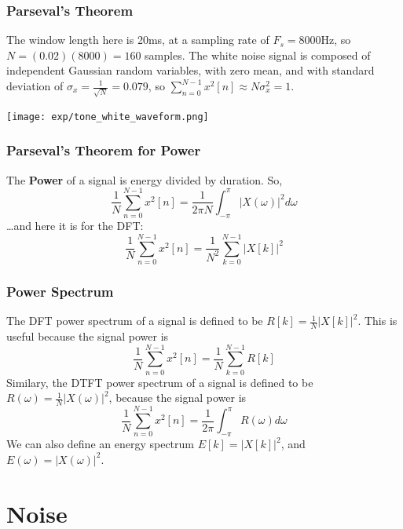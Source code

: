 \documentclass{beamer}
\begin{document}
\begin{frame}
  \frametitle{Parseval's Theorem}

  The window length here is 20ms, at a sampling rate of $F_s=8000$Hz,
  so $N=(0.02)(8000)=160$ samples.  The white noise signal is composed
  of independent Gaussian random variables, with zero mean, and with
  standard deviation of $\sigma_x=\frac{1}{\sqrt{N}}=0.079$, so
  $\sum_{n=0}^{N-1}x^2[n] \approx N\sigma_x^2 = 1$.
  
  \centerline{\texttt{[image: exp/tone\_white\_waveform.png]}}
\end{frame}

\begin{frame}
  \frametitle{Parseval's Theorem for Power}

  The {\bf Power} of a signal is energy divided by duration.  So,
  \[
  \frac{1}{N}\sum_{n=0}^{N-1}x^2[n] = \frac{1}{2\pi N}\int_{-\pi}^{\pi}\left|X(\omega)\right|^2d\omega
  \]
  \ldots and here it is for the DFT:
  \[
  \frac{1}{N}\sum_{n=0}^{N-1}x^2[n] = \frac{1}{N^2}\sum_{k=0}^{N-1}\left|X[k]\right|^2
  \]  
\end{frame}


\begin{frame}
  \frametitle{Power Spectrum}

  The DFT power spectrum of a signal is defined to be $R[k]=\frac{1}{N}|X[k]|^2$.  This is
  useful because the signal power is
  \[
  \frac{1}{N}\sum_{n=0}^{N-1}x^2[n] = \frac{1}{N} \sum_{k=0}^{N-1}R[k]
  \]  
  Similary, the DTFT power spectrum of a signal is defined to be
  $R(\omega)=\frac{1}{N}|X(\omega)|^2$, because the signal power is
  \[
  \frac{1}{N}\sum_{n=0}^{N-1}x^2[n] = \frac{1}{2\pi}\int_{-\pi}^{\pi}R(\omega)d\omega
  \]
  We can also define an energy spectrum $E[k]=|X[k]|^2$, and $E(\omega)=|X(\omega)|^2$.
\end{frame}

\section[Noise]{Noise}
\setcounter{subsection}{1}
\end{document}
